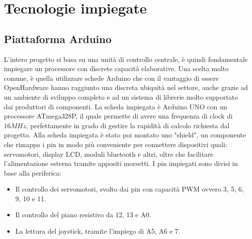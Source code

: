 \documentclass[12pt,twoside,openright]{report}
\begin{document}
\chapter{Tecnologie impiegate}\label{tecnologie}

\section{Piattaforma Arduino}\label{arduino}
L'intero progetto si basa su una unità di controllo centrale, è quindi fondamentale impiegare un processore con discrete capacità elaborative. Una scelta molto comune, è quella utilizzare schede Arduino che con il vantaggio di essere OpenHardware hanno raggiunto una discreta ubiquità nel settore, anche grazie ad un ambiente di sviluppo completo e ad un sistema di librerie molto supportato dai produttori di componenti. La scheda impiegata è Arduino UNO con un processore ATmega328P, il quale permette di avere una frequenza di clock di $16MHz$, perfettamente in grado di gestire la rapidità di calcolo richiesta dal progetto. Alla scheda impiegata è stato poi montato uno "shield", un componente che rimappa i pin in modo più conveniente per connettere dispositivi quali: servomotori, display LCD, moduli bluetooth e altri, oltre che facilitare l'alimentazione esterna tramite appositi morsetti. I pin impiegati sono divisi in base alla periferica:
\begin{itemize}
\item Il controllo dei servomotori, svolto dai pin con capacità PWM ovvero 3, 5, 6, 9, 10 e 11.
\item Il controllo del piano resistivo da 12, 13 e A0.
\item La lettura del joystick, tramite l'impiego di A5, A6 e 7.
\end{itemize}
\end{document}
